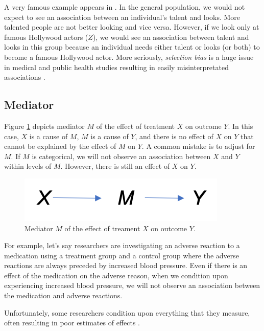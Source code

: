 \documentclass[]{book}
\begin{document}
A very famous example appears in \citet{pearl2018book}. In the general population, we would not expect to see an association between an individual's talent and looks. More talented people are not better looking and vice versa. However, if we look only at famous Hollywood actors (\(Z\)), we would see an association between talent and looks in this group because an individual needs either talent or looks (or both) to become a famous Hollywood actor. More seriously, \emph{selection bias} is a huge issue in medical and public health studies resulting in easily misinterpretated associations \citep{hernan2004structural, cole2010illustrating, elwert2014endogenous}.

\hypertarget{mediator}{%
\subsection{Mediator}\label{mediator}}

Figure \ref{fig:mediator} depicts mediator \(M\) of the effect of treatment \(X\) on outcome \(Y\). In this case, \(X\) is a cause of \(M\), \(M\) is a cause of \(Y\), and there is no effect of \(X\) on \(Y\) that cannot be explained by the effect of \(M\) on \(Y\). A common mistake is to adjust for \(M\). If \(M\) is categorical, we will not observe an association between \(X\) and \(Y\) within levels of \(M\). However, there is still an effect of \(X\) on \(Y\).

\begin{figure}
\centering
\includegraphics{./images/mediator.png}
\caption{\label{fig:mediator} Mediator \(M\) of the effect of treament \(X\) on outcome \(Y\).}
\end{figure}

For example, let's say researchers are investigating an adverse reaction to a medication using a treatment group and a control group where the adverse reactions are always preceded by increased blood pressure. Even if there is an effect of the medication on the adverse reason, when we condition upon experiencing increased blood pressure, we will not observe an association between the medication and adverse reactions.

Unfortunately, some researchers condition upon everything that they measure, often resulting in poor estimates of effects \citep{hernan2002causal}.
\end{document}
